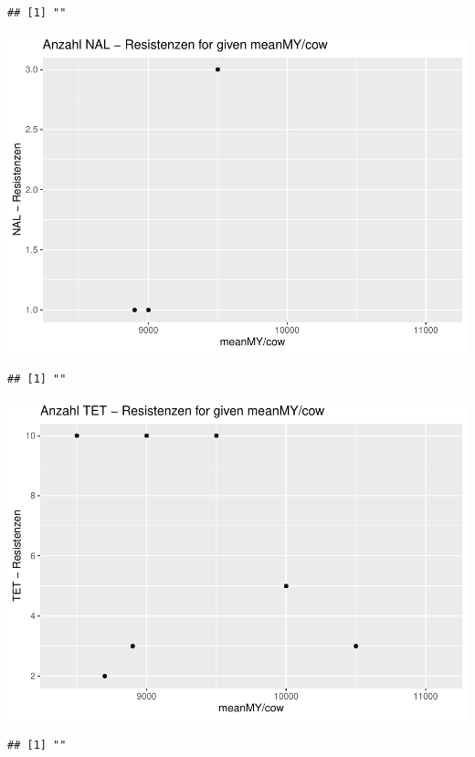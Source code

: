 \documentclass[
]{article}
\begin{document}
\begin{verbatim}
## [1] ""
\end{verbatim}

\includegraphics{NResistenzen_files/figure-latex/numerical_variables-7.pdf}

\begin{verbatim}
## [1] ""
\end{verbatim}

\includegraphics{NResistenzen_files/figure-latex/numerical_variables-8.pdf}

\begin{verbatim}
## [1] ""
\end{verbatim}
\end{document}

